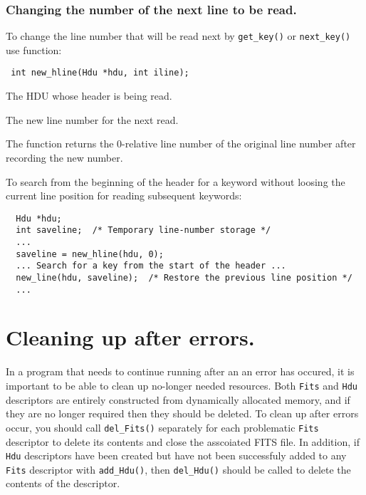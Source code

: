 \subsubsection{Changing the number of the next line to be read.}

To change the line number that will be read next by \verb`get_key()`
or \verb`next_key()` use function:

\label{new_hline}\begin{verbatim}
 int new_hline(Hdu *hdu, int iline);
\end{verbatim}


\begin{arglist}
 The HDU whose header is being read.

 The new line number for the next read.
\end{arglist}

The function returns the 0-relative line number of the original line
number after recording the new number.

To search from the beginning of the header for a keyword without
loosing the current line position for reading subsequent keywords:

\begin{verbatim}
  Hdu *hdu;
  int saveline;  /* Temporary line-number storage */
  ...
  saveline = new_hline(hdu, 0);
  ... Search for a key from the start of the header ...
  new_line(hdu, saveline);  /* Restore the previous line position */
  ...
\end{verbatim}

\section{Cleaning up after errors.}

In a program that needs to continue running after an an error has
occured, it is important to be able to clean up no-longer needed
resources. Both \verb`Fits` and \verb`Hdu` descriptors are entirely
constructed from dynamically allocated memory, and if they are no
longer required then they should be deleted. To clean up after errors
occur, you should call \verb`del_Fits()` separately for each
problematic \verb`Fits` descriptor to delete its contents and close
the asscoiated FITS file. In addition, if \verb`Hdu` descriptors have
been created but have not been successfuly added to any \verb`Fits`
descriptor with \verb`add_Hdu()`, then \verb`del_Hdu()` should be
called to delete the contents of the descriptor.

